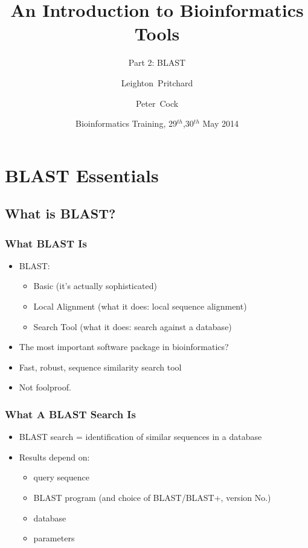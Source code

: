 \documentclass[table]{beamer}
\title[Intro to Bioinformatics] %
{An Introduction to Bioinformatics Tools}
\subtitle{Part 2: BLAST}
\author[Pritchard, Cock] %
{Leighton~Pritchard \and Peter~Cock}
\institute[The James Hutton Institute] %
{
  Information and Computational Sciences\\
  The James Hutton Institute
}
\date[May 2014] %
{Bioinformatics Training, 29$^{th}$,30$^{th}$ May 2014}
\begin{document}
  \frame[plain]{\titlepage}
  
  \section{BLAST Essentials}
  
    \subsection{What is BLAST?}
    \begin{frame}
     \frametitle{What BLAST Is}
     \begin{itemize}
       \item<1-> BLAST:
       \begin{itemize}
         \item<1-> Basic (it's actually sophisticated)
         \item<1-> Local Alignment (what it does: local sequence alignment)
         \item<1-> Search Tool (what it does: search against a database)
       \end{itemize}
       \item<2-> The most important software package in bioinformatics?
       \item<2-> Fast, robust, sequence similarity search tool
       \item<2-> Not foolproof.
     \end{itemize}
    \end{frame}
  
    \begin{frame}
     \frametitle{What A BLAST Search Is}
     \begin{itemize}
       \item BLAST search = identification of similar sequences in a database
       \item Results depend on:
       \begin{itemize}
         \item query sequence
         \item BLAST program (and choice of BLAST/BLAST+, version No.)
         \item database
         \item parameters
       \end{itemize}
     \end{itemize}
    \end{frame}  
  
\end{document}
